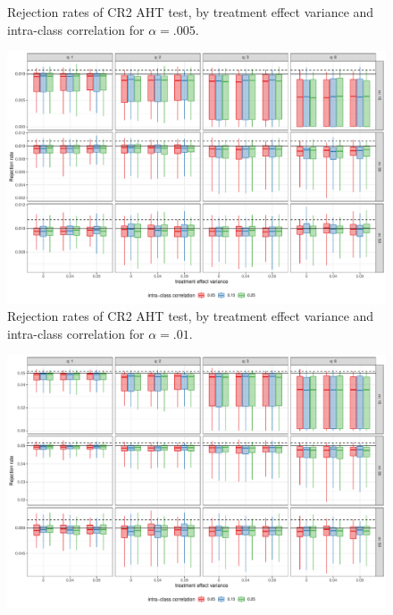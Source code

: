 \documentclass[12pt]{article}
\begin{document}
\begin{landscape}
\begin{figure}[p]
{}

\caption{Rejection rates of CR2 AHT test, by treatment effect variance and intra-class correlation for $\alpha = .005$.}\label{fig:misspecification_005}
\end{figure}

\begin{figure}[p]

{\centering \includegraphics[width=\linewidth]{CR_fig/misspecification_01-1} 

}

\caption{Rejection rates of CR2 AHT test, by treatment effect variance and intra-class correlation for $\alpha = .01$.}\label{fig:misspecification_01}
\end{figure}

\begin{figure}[p]

{\centering \includegraphics[width=\linewidth]{CR_fig/misspecification_05-1} 

}
\end{figure}
\end{landscape}
\end{document}
